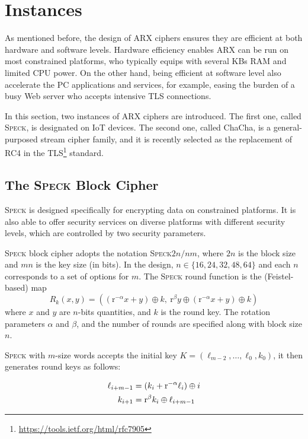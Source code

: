 \section{Instances}
\label{sec:instances}

As mentioned before, the design of ARX ciphers ensures they are efficient at both
hardware and software levels. Hardware efficiency enables ARX can be run on most
constrained platforms, who typically equips with several KBs RAM and limited CPU power.
On the other hand, being efficient at software level also accelerate the PC applications
and services, for example, easing the burden of a busy Web server who accepts intensive
TLS connections.

In this section, two instances of ARX ciphers are introduced. The first one, called
\textsc{Speck}\cite{beaulieu2015simon2}, is designated on IoT devices. The second one,
called ChaCha\cite{bernstein2008chacha}, is a general-purposed stream cipher family,
and it is recently selected as the replacement of RC4 in the
TLS\footnote{\url{https://tools.ietf.org/html/rfc7905}} standard.

\subsection{The \textsc{\textbf{Speck}} Block Cipher}

\textsc{Speck} is designed specifically for encrypting data on constrained platforms.
It is also able to offer security services on diverse platforms with different security
levels, which are controlled by two security parameters.

\textsc{Speck} block cipher adopts the notation \textsc{Speck}$2n/nm$, where $2n$ is the
block size and $mn$ is the key size (in bits). In the design, $n\in\{16,24,32,48,64\}$
and each $n$ corresponds to a set of options for $m$. The \textsc{Speck} round function
is the (Feistel-based) map
$$R_k(x,y)=((\mathrm{r}^{-\alpha}x+y)\oplus k,\ \mathrm{r}^\beta y\oplus(\mathrm{r}^{-\alpha}x+y)\oplus k)$$
where $x$ and $y$ are $n$-bits quantities, and $k$ is the round key. The rotation
parameters $\alpha$ and $\beta$, and the number of rounds are specified along with
block size $n$.

\textsc{Speck} with $m$-size words accepts the initial key $K=(\ell_{m-2},\dots,\ell_0,k_0)$,
it then generates round keys as follows:

\begin{equation*}
\setlength{\abovedisplayshortskip}{0em}
\setlength{\abovedisplayskip}{0em}
\begin{split}
\ell_{i+m-1} &= (k_i+\mathrm{r}^{-\alpha}\ell_i)\oplus i\\
k_{i+1} &= \mathrm{r}^\beta k_i \oplus \ell_{i+m-1}
\end{split}
\end{equation*}

